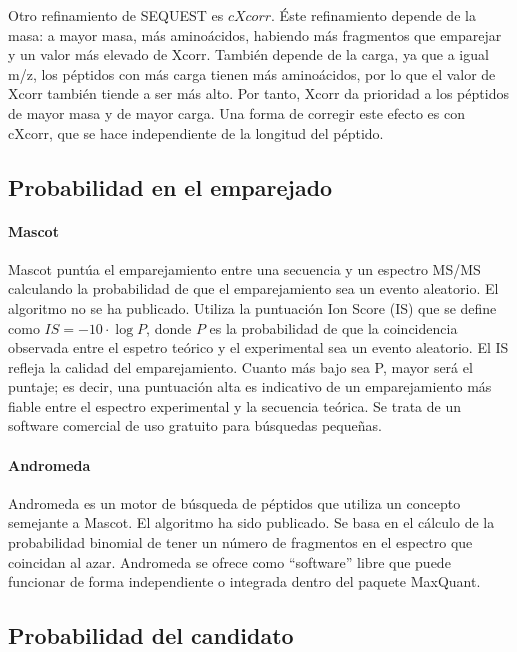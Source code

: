 Otro refinamiento de SEQUEST es $cXcorr$. Éste refinamiento depende de la masa: a mayor masa, más aminoácidos, habiendo más fragmentos que emparejar y un valor más elevado de Xcorr. También depende de la carga, ya que a igual m/z, los péptidos con más carga tienen más aminoácidos, por lo que el valor de Xcorr también tiende a ser más alto. Por tanto, Xcorr da prioridad a los péptidos de mayor masa y de mayor carga. Una forma de corregir este efecto es con cXcorr, que se hace independiente de la longitud del péptido.

\subsection{Probabilidad en el emparejado}
\paragraph{Mascot}
Mascot puntúa el emparejamiento entre una secuencia y un espectro MS/MS calculando la probabilidad de que el emparejamiento sea un evento aleatorio. El algoritmo no se ha publicado. Utiliza la puntuación Ion Score (IS) que se define como $IS = -10 \cdot \log P$, donde $P$ es la probabilidad de que la coincidencia observada entre el espetro teórico y el experimental sea un evento aleatorio. El IS refleja la calidad del emparejamiento. Cuanto más bajo sea P, mayor será el puntaje; es decir, una puntuación alta es indicativo de un emparejamiento más fiable entre el espectro experimental y la secuencia teórica. Se trata de un software comercial de uso gratuito para búsquedas pequeñas.

\paragraph{Andromeda}
Andromeda es un motor de búsqueda de péptidos que utiliza un concepto semejante a Mascot. El algoritmo ha sido publicado. Se basa en el cálculo de la probabilidad binomial de tener un número de fragmentos en el espectro que coincidan al azar. Andromeda se ofrece como “software” libre que puede funcionar de forma independiente o integrada dentro del paquete MaxQuant.

\subsection{Probabilidad del candidato}
